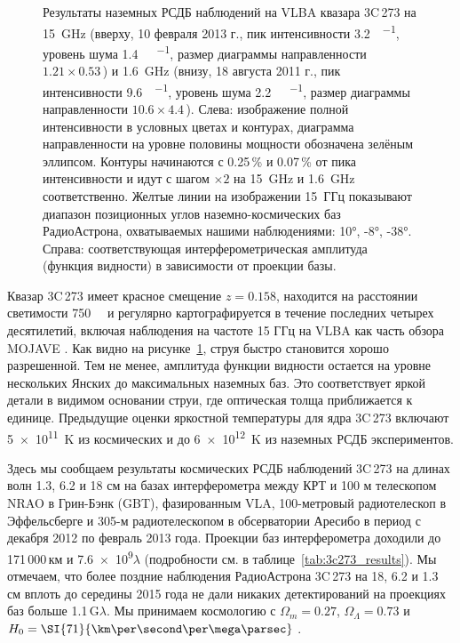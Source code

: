 \begin{figure}[]
{}
\caption{Результаты наземных РСДБ наблюдений на VLBA квазара 3C\,273 на \SI{15}{\GHz} (вверху, 10
февраля 2013 г., пик интенсивности \SI{3.2}{\jansky\per\beam}, уровень шума
\SI{1.4}{\milli\jansky\per\beam}, размер диаграммы направленности $1.21\times0.53$\,\si{\mas}) и
\SI{1.6}{\GHz} (внизу, 18 августа 2011 г., пик интенсивности \SI{9.6}{\jansky\per\beam}, уровень
шума \SI{2.2}{\milli\jansky\per\beam}, размер диаграммы направленности $10.6\times4.4$\,\si{\mas}).
Слева: изображение полной интенсивности в условных цветах и контурах, диаграмма направленности на
уровне половины мощности обозначена зелёным эллипсом. Контуры начинаются с 0.25\,\% и 0.07\,\% от
пика интенсивности и идут с шагом $\times2$ на \SI{15}{\GHz} и \SI{1.6}{\GHz} соответственно.
Желтые линии на изображении 15~ГГц показывают диапазон позиционных углов наземно-космических баз
РадиоАстрона, охватываемых нашими наблюдениями: \ang{10}, \ang{-8}, \ang{-38}.
Справа: соответствующая интерферометрическая амплитуда (функция видности) в зависимости от проекции
базы.}
\label{fig:3c273_ground}
\end{figure}

Квазар 3C\,273 имеет красное смещение $z = 0.158$, находится на расстоянии светимости
\SI{750}{\mega\parsec} и регулярно картографируется в течение последних четырех десятилетий,
включая наблюдения на частоте 15 ГГц на VLBA как часть обзора MOJAVE \cite{Lister_2013}. Как видно
на рисунке~\ref{fig:3c273_ground}, струя быстро становится хорошо разрешенной. Тем не менее,
амплитуда функции видности остается на уровне нескольких Янских до максимальных наземных баз. Это
соответствует яркой детали в видимом основании струи, где оптическая толща приближается к единице.
Предыдущие оценки яркостной температуры для ядра 3C\,273 включают \SI{5e11}{\kelvin} из космических
\cite{Dodson_2008} и до \SI{6e12}{\kelvin} из наземных \cite{Kovalev_2005} РСДБ экспериментов.

Здесь мы сообщаем результаты космических РСДБ наблюдений 3C\,273 на длинах волн 1.3, 6.2 и 18 см на
базах интерферометра между КРТ и 100 м телескопом NRAO в Грин-Бэнк (GBT),
фазированным VLA, 100-метровый радиотелескоп в Эффельсберге и 305-м радиотелескопом в обсерватории
Аресибо в период с декабря 2012 по февраль 2013 года. Проекции баз интерферометра доходили до
171\,000\,км и \num{7.6e9}$\lambda$ (подробности см. в таблице~\ref{tab:3c273_results}). Мы
отмечаем, что более поздние наблюдения РадиоАстрона 3C\,273 на 18, 6.2 и 1.3 см вплоть до середины
2015 года не дали никаких детектирований на проекциях баз больше 1.1\,G$\lambda$. Мы принимаем
космологию с $\Omega_m=0.27$, $\Omega_\Lambda = 0.73$ и $H_0 =
\SI{71}{\km\per\second\per\mega\parsec}$ \cite{Komatsu_2009}.

